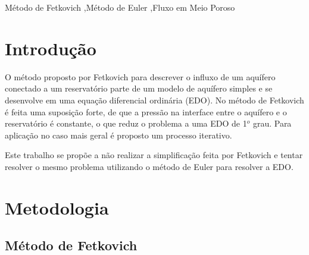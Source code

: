 \documentclass[final,5p]{elsarticle}
\numberwithin{equation}{section}
\begin{document}
\begin{frontmatter}
\begin{abstract}
\end{abstract}




\begin{keyword}
    Método de Fetkovich \sep Método de Euler \sep Fluxo em Meio Poroso



\end{keyword}

\end{frontmatter}


\section{Introdução}

    O método proposto por Fetkovich para descrever o influxo de um aquífero conectado a um reservatório parte de um modelo de aquífero simples e se desenvolve em uma equação diferencial ordinária (EDO). No método de Fetkovich é feita uma suposição forte, de que a pressão na interface entre o aquífero e o reservatório é constante, o que reduz o problema a uma EDO de 1$^o$ grau. Para aplicação no caso mais geral é proposto um processo iterativo.

    Este trabalho se propõe a não realizar a simplificação feita por Fetkovich e tentar resolver o mesmo problema utilizando o método de Euler para resolver a EDO.

\section{Metodologia}

    \subsection{Método de Fetkovich}
\end{document}
